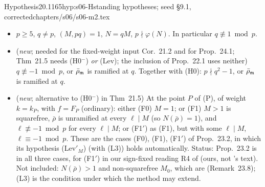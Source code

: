 \begin{quoted}{Hypothesis}{20.1}{165}{hyp:s06-H}{standing hypotheses; seed \S9.1, corrected}{chapters/s06/s06-m2.tex}\label{rpt:hyp:s06-H}
\leavevmode
\begin{itemize}
\item[(H0)] $p\ge5$, $q\ne p$, $(M,pq)=1$, $N=qM$, $p\nmid\varphi(N)$. In particular $q\not\equiv1\bmod p$.
\item[(H0$^-$)] (\emph{new}; needed for the fixed-weight input Cor.~21.2 and for Prop.~24.1;
  Thm~21.5 needs (H0$^-$) \emph{or} (Lev); the inclusion of Prop.~22.1 uses neither)
  $q\not\equiv-1\bmod p$, or $\bar\rho_{\mathfrak{m}}$ is ramified at $q$. Together with (H0): $p\nmid q^2-1$, or $\bar\rho_{\mathfrak{m}}$ is ramified at $q$.
\item[(Lev)] (\emph{new}; alternative to (H0$^-$) in Thm~21.5) At the point $P$ of (P), of weight $k=k_P$, with
  $f=F_P$ (ordinary): either (F0) $M=1$; or (F1) $M>1$ is squarefree, $\bar\rho$ is unramified at every $\ell\mid M$ (so $N(\bar\rho)=1$),
  and $\ell\not\equiv-1\bmod p$ for every $\ell\mid M$; or (F1$'$) as (F1), but with some $\ell\mid M$, $\ell\equiv-1\bmod p$. These are the
  cases (F0), (F1), (F1$'$) of Prop.~23.2, in which its hypothesis (Lev$'_M$) (with (L3)) holds automatically. Status:
  Prop.~23.2 is \stpmc{} in all three cases, for (F1$'$) in our sign-fixed reading R4 of \cite[Thm~3.14]{KO} (ours, not
  \cite{KO}'s text). Not included: $N(\bar\rho)>1$ and non-squarefree $M_0$, which are \stopen{} (Remark~23.8); (L3) is the condition under
  which the method may extend.


\end{itemize}
\end{quoted}
